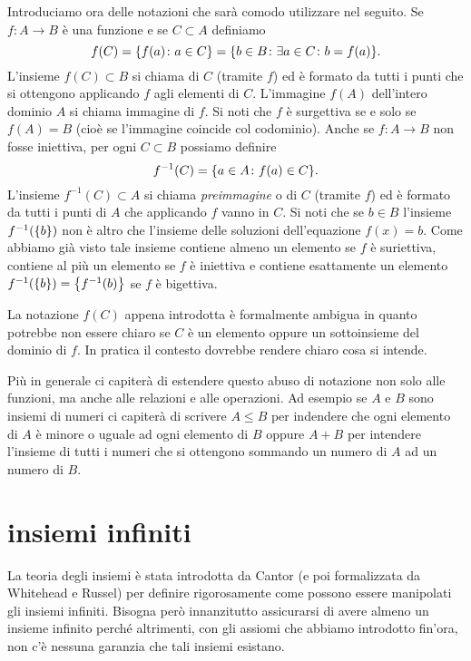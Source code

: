 Introduciamo ora delle notazioni che sarà comodo utilizzare nel seguito.
Se $f\colon A \to B$ è una funzione e se $C\subset A$ definiamo
\[
  f(C) = {\left\{ f(a)\colon a \in C \right\}} = {\left\{ b\in B\colon \exists a\in C\colon b=f(a) \right\}}.
\]
L'insieme $f(C)\subset B$ si chiama 
%
di $C$ (tramite $f$) ed è formato
da tutti i punti che si ottengono applicando $f$ agli elementi di $C$.
L'immagine $f(A)$ dell'intero dominio $A$ si chiama immagine di $f$.
Si noti che $f$ è surgettiva se e solo se $f(A)=B$ (cioè se l'immagine coincide
col codominio).
Anche se $f\colon A \to B$ non fosse iniettiva,
per ogni $C\subset B$ possiamo definire
\[
  f^{-1}(C) = {\left\{ a\in A\colon f(a) \in C \right\}}.
\]
L'insieme $f^{-1}(C)\subset A$ si chiama \emph{preimmagine}
o 
%
di $C$ (tramite $f$)
ed è formato da tutti i punti di $A$ che applicando $f$ vanno in $C$.
Si noti che se $b\in B$ l'insieme $f^{-1}({\left\{ b \right\}})$ non è altro che
l'insieme delle soluzioni dell'equazione $f(x)=b$. Come abbiamo
già visto tale insieme contiene almeno un elemento se $f$ è suriettiva,
contiene al più un elemento se $f$ è iniettiva e contiene esattamente
un elemento $f^{-1}({\left\{ b \right\}}) = {\left\{ f^{-1}(b) \right\}}$ se $f$ è bigettiva.

La notazione $f(C)$ appena introdotta è formalmente ambigua in quanto
potrebbe non essere chiaro se $C$ è un elemento oppure un sottoinsieme
del dominio di $f$.
In pratica il contesto dovrebbe rendere chiaro cosa si intende.

Più in generale ci capiterà di estendere questo abuso di notazione non solo
alle funzioni, ma anche alle relazioni e alle operazioni.
Ad esempio se $A$ e $B$ sono insiemi di numeri ci capiterà di scrivere $A\le B$
per indendere che ogni elemento di $A$ è minore o uguale ad ogni elemento di $B$
oppure $A+B$ per intendere l'insieme di tutti i numeri che si ottengono sommando
un numero di $A$ ad un numero di $B$.

\section{insiemi infiniti}

La teoria degli insiemi è stata introdotta da Cantor (e poi formalizzata
da Whitehead e Russel) per definire rigorosamente come possono essere
manipolati gli insiemi infiniti. Bisogna però innanzitutto assicurarsi
di avere almeno un insieme infinito perché altrimenti, con gli assiomi
che abbiamo introdotto fin'ora, non c'è nessuna garanzia che tali insiemi esistano.

